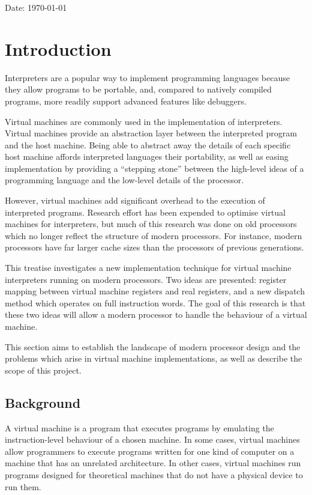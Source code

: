 	Date: \today

\tableofcontents

\chapter{Introduction}
	\startrealnumbers
	Interpreters are a popular way to implement programming languages because they allow programs to be portable, and, compared to natively compiled programs, more readily support advanced features like debuggers. 
	
	Virtual machines are commonly used in the implementation of interpreters. Virtual machines provide an abstraction layer between the interpreted program and the host machine. Being able to abstract away the details of each specific host machine affords interpreted languages their portability, as well as easing implementation by providing a ``stepping stone'' between the high-level ideas of a programming language and the low-level details of the processor.
	
	However, virtual machines add significant overhead to the execution of interpreted programs. Research effort has been expended to optimise virtual machines for interpreters, but much of this research was done on old processors which no longer reflect the structure of modern processors. For instance, modern processors have far larger cache sizes than the processors of previous generations.
	
	This treatise investigates a new implementation technique for virtual machine interpreters running on modern processors. Two ideas are presented: register mapping between virtual machine registers and real registers, and a new dispatch method which operates on full instruction words. The goal of this research is that these two ideas will allow a modern processor to handle the behaviour of a virtual machine.
	
	This section aims to establish the landscape of modern processor design and the problems which arise in virtual machine implementations, as well as describe the scope of this project.
	
	\section{Background}
		A virtual machine is a program that executes programs by emulating the instruction-level behaviour of a chosen machine. In some cases, virtual machines allow programmers to execute programs written for one kind of computer on a machine that has an unrelated architecture. In other cases, virtual machines run programs designed for theoretical machines that do not have a physical device to run them.
		
